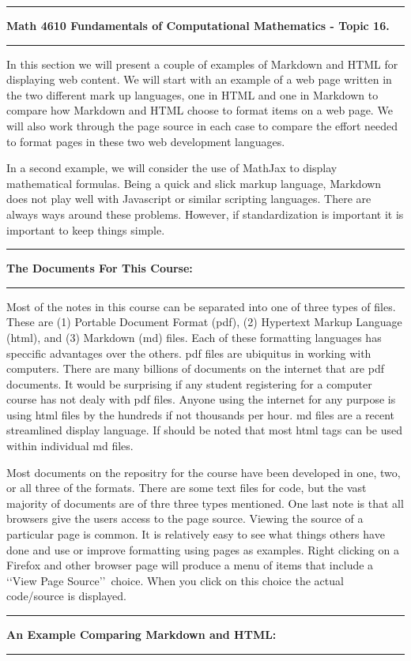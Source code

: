 \documentclass[10pt,fleqn]{article}
\begin{document}
\vskip0.1in\hrule\vskip0.1in \noindent
{\bf Math 4610 Fundamentals of Computational Mathematics  - Topic 16.}
\vskip0.1in\hrule\vskip0.1in \noindent
In this section we will present a couple of examples of Markdown and HTML for
displaying web content. We will start with an example of a web page written in
the two different mark up languages, one in HTML and one in Markdown to compare
how Markdown and HTML choose to format items on a web page. We will also work
through the page source in each case to compare the effort needed to format
pages in these two web development languages.

In a second example, we will consider the use of MathJax to display mathematical
formulas. Being a quick and slick markup language, Markdown does not play well
with Javascript or similar scripting languages. There are always ways around 
these problems. However, if standardization is important it is important to keep
things simple.
\vskip0.1in\hrule\vskip0.1in \noindent
{\bf The Documents For This Course:}
\vskip0.1in\hrule\vskip0.1in \noindent
Most of the notes in this course can be separated into one of three types of
files. These are (1) Portable Document Format (pdf), (2) Hypertext Markup
Language (html), and (3) Markdown (md) files. Each of these formatting languages
has speccific advantages over the others. pdf files are ubiquitus in working
with computers. There are many billions of documents on the internet that are
pdf documents. It would be surprising if any student registering for a computer
course has not dealy with pdf files. Anyone using the internet for any purpose
is using html files by the hundreds if not thousands per hour. md files are a
recent streamlined display language. If should be noted that most html tags can
be used within individual md files.

Most documents on the repositry for the course have been developed in one, two,
or all three of the formats. There are some text files for code, but the vast
majority of documents are of thre three types mentioned. One last note is that
all browsers give the users access to the page source. Viewing the source of a 
particular page is common. It is relatively easy to see what things others have
done and use or improve formatting using pages as examples. Right clicking on a
Firefox and other browser page will produce a menu of items that include a
\lq\lq View Page Source\rq\rq\ choice. When you click on this choice the actual
code/source is displayed.
\vskip0.1in\hrule\vskip0.1in \noindent
{\bf An Example Comparing Markdown and HTML:}
\vskip0.1in\hrule\vskip0.1in \noindent
\end{document}
